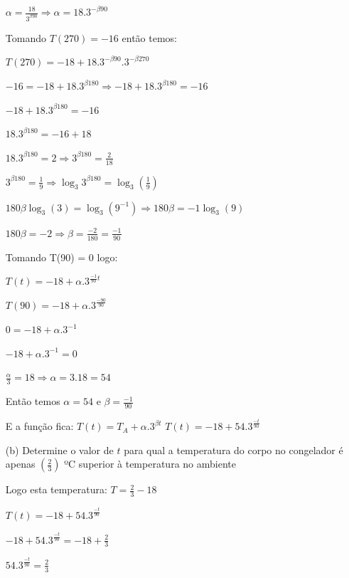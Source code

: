 \begin{multicols*}{2}
\begin{itemize}
              $\alpha = \frac{18}{3^{\beta 90}} \Rightarrow \alpha = 18.3^{ - \beta 90}$

              Tomando $T(270) = -16$ então temos:

              $T(270) = -18 + 18.3^{ - \beta 90}.3^{- \beta 270}$

              $-16 = -18 +18.3^{\beta 180} \Rightarrow -18 +18.3^{\beta 180} = -16$

              $-18 +18.3^{\beta 180} = -16$

              $18.3^{\beta 180} = -16 +18 $

              $18.3^{\beta 180} = 2 \Rightarrow 3^{\beta 180} = \frac{2}{18} $

              $3^{\beta 180} = \frac{1}{9} \Rightarrow \log_3 3^{\beta 180} = \log_3 \left( \frac{1}{9}				\right)$

              $180 \beta \log_3 (3) = \log_3 (9^{-1})  \Rightarrow 180 \beta = -1 \log_3 (9)$

              $180 \beta = -2 \Rightarrow \beta = \frac{-2}{180} = \frac{-1}{90}$

              Tomando T(90) = 0 logo:

              $T(t) = -18 + \alpha.3^{\frac{-1}{90} t}$

              $T(90) = -18 + \alpha.3^{\frac{-90}{90} }$

              $0 = -18 + \alpha.3^{-1}$

              $-18 + \alpha.3^{-1} = 0$

              $\frac{\alpha}{3} = 18 \Rightarrow \alpha = 3.18 = 54$


              Então temos $\alpha = 54$ e $\beta = \frac{-1}{90}$

              E a função fica: $T(t) = T_A + \alpha.3^{\beta t}$
              $T(t) = -18 + 54.3^{\frac{-t}{90}}$

        \item[(b)] Determine o valor de $t$ para qual a temperatura do corpo no congelador é apenas
              $\left( \frac{2}{3} \right)$ ºC superior à temperatura no ambiente

              Logo esta temperatura: $T = \frac{2}{3} -18 $

              $T(t) = -18 + 54.3^{\frac{-t}{90}}$

              $-18 + 54.3^{\frac{-t}{90}} = -18 + \frac{2}{3}$

              $ 54.3^{\frac{-t}{90}} = \frac{2}{3}$


\end{itemize}
\end{multicols*}
